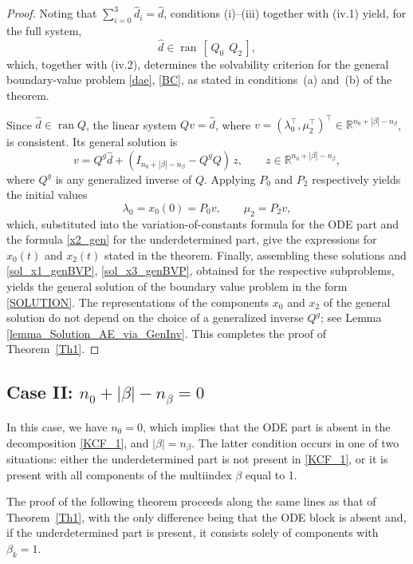 \documentclass[preprint,12pt]{elsarticle}
\numberwithin{equation}{section}
\theoremstyle{definition}
\begin{document}
\begin{proof}
Noting that \(\sum_{i=0}^{3}\widehat d_i=\widehat d\), conditions (i)–(iii) together with (iv.1) yield, for the full system,
\[
\widehat d \in \operatorname{ran}\,[\,Q_0\ \ Q_2\,],
\]
which, together with (iv.2), determines the solvability criterion for the general boundary-value problem \eqref{dae}, \eqref{BC}, as stated in conditions~(a) and~(b) of the theorem.


Since $\widehat{d}\in\operatorname{ran}Q$, the linear system $Qv=\widehat{d}$, where $v=\left(\lambda_0^\top,\mu_2^\top\right)^\top\in\mathbb{R}^{n_0+|\beta|-n_\beta}$, is consistent. Its general solution is
\[
v = Q^g\widehat{d} + (I_{n_0+|\beta|-n_\beta} - Q^gQ)\,z, \qquad z \in \mathbb{R}^{n_0+|\beta|-n_\beta},
\]
where $Q^g$ is any generalized inverse of $Q$. Applying $P_0$ and $P_2$ respectively yields the initial values
\[
\lambda_0 = x_0(0) = P_0 v, \qquad \mu_2 = P_2 v,
\]
which, substituted into the variation-of-constants formula for the ODE part and the formula \eqref{x2_gen} for the underdetermined part, give the expressions for $x_0(t)$ and $x_2(t)$ stated in the theorem. Finally, assembling these solutions and \eqref{sol_x1_genBVP}, \eqref{sol_x3_genBVP}, obtained for the respective subproblems, yields the general solution of the boundary value problem in the form \eqref{SOLUTION}. The representations of the components $x_0$ and $x_2$ of the general solution do not depend on the choice of a generalized inverse $Q^g$; see Lemma \ref{lemma_Solution_AE_via_GenInv}. This completes the proof of Theorem~\ref{Th1}.

\end{proof}




\subsection{Case II: $n_0+|\beta| - n_{\beta} = 0$}

In this case, we have \( n_0 = 0 \), which implies that the ODE part is absent in the decomposition \eqref{KCF_1}, and \( |\beta| = n_\beta \). The latter condition occurs in one of two situations: either the underdetermined part is not present in \eqref{KCF_1}, or it is present with all components of the multiindex \( \beta \) equal to 1.

The proof of the following theorem proceeds along the same lines as that of Theorem~\ref{Th1}, with the only difference being that the ODE block is absent and, if the underdetermined part  is present,  it consists solely of components with $\beta_k=1$.
\end{document}
